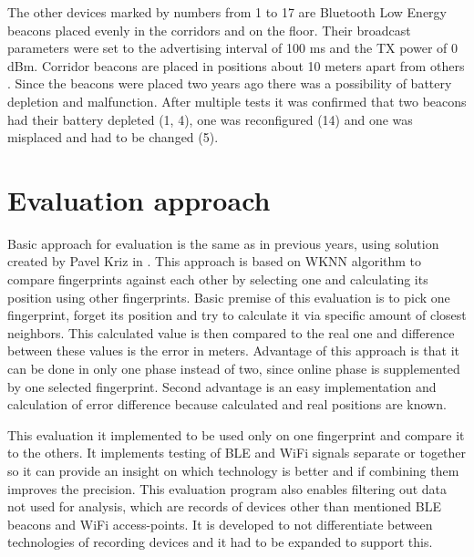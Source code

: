 The other devices marked by numbers from 1 to 17 are Bluetooth Low Energy beacons placed evenly in the corridors and on the floor. Their broadcast parameters were set to the advertising interval of 100 ms and the TX power of 0 dBm. Corridor beacons are placed in positions about 10 meters apart from others \cite{IILUBLEB}. Since the beacons were placed two years ago there was a possibility of battery depletion and malfunction. After multiple tests it was confirmed that two beacons had their battery depleted (1, 4), one was reconfigured (14) and one was misplaced and had to be changed (5).

\section{Evaluation approach}\label{sec:EvaluationApproach}
Basic approach for evaluation is the same as in previous years, using solution created by Pavel Kriz in \cite{IILUBLEB}. This approach is based on WKNN algorithm to compare fingerprints against each other by selecting one and calculating its position using other fingerprints. Basic premise of this evaluation is to pick one fingerprint, forget its position and try to calculate it via specific amount of closest neighbors. This calculated value is then compared to the real one and difference between these values is the error in meters. Advantage of this approach is that it can be done in only one phase instead of two, since online phase is supplemented by one selected fingerprint. Second advantage is an easy implementation and calculation of error difference because calculated and real positions are known.

This evaluation it implemented to be used only on one fingerprint and compare it to the others. It implements testing of BLE and WiFi signals separate or together so it can provide an insight on which technology is better and if combining them improves the precision. This evaluation program also enables filtering out data not used for analysis, which are records of devices other than mentioned BLE beacons and WiFi access-points. It is developed to not differentiate between technologies of recording devices and it had to be expanded to support this.


